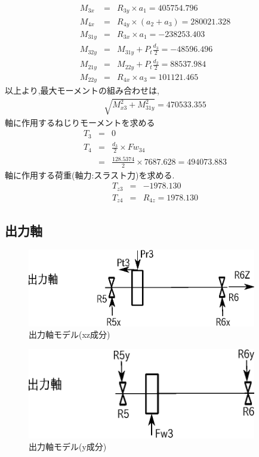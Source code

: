 \documentclass[a4j,twoside,openright,11pt]{jreport}
\begin{document}
\begin{eqnarray}
M_{3x} &=& R_{3y} \times a_1=405754.796\\
M_{4x} &=& R_{4y} \times (a_2+a_3)=280021.328\\
M_{31y} &=& R_{3x} \times a_1=-238253.403\\
M_{32y} &=& M_{31y} + P_t \frac{d_3}{2}=-48596.496\\
M_{21y} &=& M_{22y} + P_t \frac{d_2}{2}=88537.984\\
M_{22y} &=& R_{4x} \times a_3=101121.465
\end{eqnarray}
以上より,最大モーメントの組み合わせは,
\begin{eqnarray}
\sqrt{ M_{x3}^2 + M_{31y}^2 } = 470533.355
\end{eqnarray}
軸に作用するねじりモーメントを求める
\begin{eqnarray}
T_{3} &=& 0\\
T_{4} &=& \frac{d_3}{2} \times Fw_{34}\\
      &=& \frac{128.5374}{2} \times 7687.628 = 494073.883
\end{eqnarray}
軸に作用する荷重(軸力:スラスト力)を求める.
\begin{eqnarray}
T_{z3} &=& -1978.130\\
T_{z4} &=& R_{4z} = 1978.130
\end{eqnarray}

\subsection{出力軸}
\begin{figure}[htbp]
\begin{center}
\includegraphics[width=10cm]{jiku3.eps}
\end{center}
\caption{出力軸モデル(xz成分)}
\end{figure}
\begin{figure}[htbp]
\begin{center}
\includegraphics[width=10cm]{jiku32.eps}
\end{center}
\caption{出力軸モデル(y成分)}
\end{figure}
\end{document}
